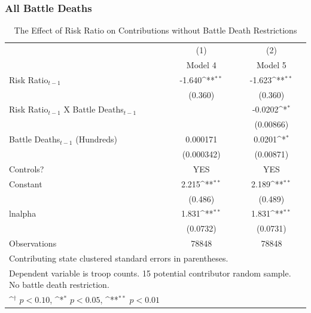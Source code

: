 \documentclass{beamer}
\begin{document}
\begin{frame}[fragile]
\frametitle{All Battle Deaths}

\begin{table}[htbp]\centering
\tiny
\def\sym#1{\ifmmode^{#1}\else\(^{#1}\)\fi}
\caption{The Effect of Risk Ratio on Contributions without Battle Death Restrictions \label{Table 5}}
\vspace{0.4cm}
\begin{tabular}{l*{2}{c}}
\hline\hline
                    &\multicolumn{1}{c}{(1)}        &\multicolumn{1}{c}{(2)}        \\
                    &          Model 4        &          Model 5       \\
\hline
Risk Ratio$_{t-1}$          &      -1.640\sym{**}&      -1.623\sym{**}\\
                    &     (0.360)        &     (0.360)        \\
[1em]
Risk Ratio$_{t-1}$ X Battle Deaths$_{t-1}$ &                    &     -0.0202\sym{*} \\
                    &                    &   (0.00866)        \\
[1em]
Battle Deaths$_{t-1}$ (Hundreds)&    0.000171        &      0.0201\sym{*} \\
                    &  (0.000342)        &   (0.00871)        \\
[1em]
Controls?           &         YES        &         YES        \\
[1em]
Constant            &       2.215\sym{**}&       2.189\sym{**}\\
                    &     (0.486)        &     (0.489)        \\
\hline
lnalpha             &       1.831\sym{**}&       1.831\sym{**}\\
                    &    (0.0732)        &    (0.0731)        \\
\hline
Observations        &       78848        &       78848        \\
\hline\hline
\multicolumn{3}{l}{\tiny Contributing state clustered standard errors in parentheses.}\\
\multicolumn{3}{l}{\tiny Dependent variable is troop counts. 15 potential contributor random sample. No battle death restriction.}\\
\multicolumn{3}{l}{\tiny \sym{\dagger} \(p<0.10\), \sym{*} \(p<0.05\), \sym{**} \(p<0.01\)}\\
\end{tabular}
\end{table}

\end{frame}
\end{document}
